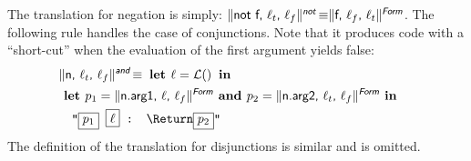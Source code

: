 \documentclass{llncs}
\newcommand{\trad}[2]{\ensuremath{\lVert \textsf{#1} \rVert^{\textit{#2}}}}
\newcommand{\nl}[0]{\text{\Return}}
\DeclareMathOperator{\isdef}{\equiv}
\DeclareMathOperator{\name}{\mathcal{L}()}
\newcommand{\llvm}[1]{\texttt{#1}}
\newcommand{\B}[1]{\textsf{#1}}
\newcommand{\LET}[0]{\textbf{ let }}
\newcommand{\IN}[0]{\textbf{ in }}
\newcommand{\AND}[0]{\textbf{ and }}
\newcommand{\PH}[1]{\framebox{$#1$}}
\begin{document}
\noindent The translation for negation is simply: $\trad{not f, $\ell_t$,
  $\ell_f$}{\B{not}} \isdef \trad{f, $\ell_f$, $\ell_t$}{\B{Form}}$.  The
following rule handles the case of conjunctions. Note that it produces code with
a ``short-cut'' when the evaluation of the first argument yields false:
\begin{align*}
\begin{split}
  \lefteqn{\trad{n, $\ell_t$, $\ell_f$}{\B{and}} \isdef \LET \ell = \name \IN} \\
  & \LET p_1 = \trad{n.arg1, $\ell$, $\ell_f$}{\B{Form}}
  \AND p_2 = \trad{n.arg2, $\ell_t$, $\ell_f$}{\B{Form}} \IN \\
  & \quad \llvm{"\PH{p_1} \PH{\ell} :  \nl \PH{p_2}"}
\end{split}
\end{align*}
The definition of the translation for disjunctions is similar and is omitted.
\end{document}
